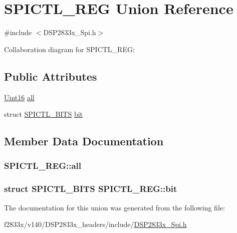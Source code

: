 \hypertarget{union_s_p_i_c_t_l___r_e_g}{}\section{S\+P\+I\+C\+T\+L\+\_\+\+R\+E\+G Union Reference}
\label{union_s_p_i_c_t_l___r_e_g}


{\ttfamily \#include $<$D\+S\+P2833x\+\_\+\+Spi.\+h$>$}



Collaboration diagram for S\+P\+I\+C\+T\+L\+\_\+\+R\+E\+G\+:
\subsection*{Public Attributes}
\begin{DoxyCompactItemize}
\item 
\hyperlink{_d_s_p2833x___device_8h_a59a9f6be4562c327cbfb4f7e8e18f08b}{Uint16} \hyperlink{union_s_p_i_c_t_l___r_e_g_a9ed5a3436d765563433e64016b0a288c}{all}
\item 
struct \hyperlink{struct_s_p_i_c_t_l___b_i_t_s}{S\+P\+I\+C\+T\+L\+\_\+\+B\+I\+T\+S} \hyperlink{union_s_p_i_c_t_l___r_e_g_a551b73096f409c794f9c2c69be3b9f14}{bit}
\end{DoxyCompactItemize}


\subsection{Member Data Documentation}
\hypertarget{union_s_p_i_c_t_l___r_e_g_a9ed5a3436d765563433e64016b0a288c}{}
\subsubsection[{all}]{ S\+P\+I\+C\+T\+L\+\_\+\+R\+E\+G\+::all}\label{union_s_p_i_c_t_l___r_e_g_a9ed5a3436d765563433e64016b0a288c}
\hypertarget{union_s_p_i_c_t_l___r_e_g_a551b73096f409c794f9c2c69be3b9f14}{}
\subsubsection[{bit}]{\setlength{\rightskip}{0pt plus 5cm}struct {\bf S\+P\+I\+C\+T\+L\+\_\+\+B\+I\+T\+S} S\+P\+I\+C\+T\+L\+\_\+\+R\+E\+G\+::bit}\label{union_s_p_i_c_t_l___r_e_g_a551b73096f409c794f9c2c69be3b9f14}


The documentation for this union was generated from the following file\+:\begin{DoxyCompactItemize}
\item 
f2833x/v140/\+D\+S\+P2833x\+\_\+headers/include/\hyperlink{_d_s_p2833x___spi_8h}{D\+S\+P2833x\+\_\+\+Spi.\+h}\end{DoxyCompactItemize}
